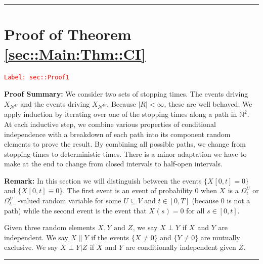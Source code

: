 \documentclass[12pt]{article}
\newcommand{\skipLine}{\vspace{12pt}}
\newcommand{\mb}{\mathbb}
\newcommand{\mc}{\mathcal}
\newcommand{\te}{\text}
\newcommand{\tr}{\textcolor{red}}
\newcommand{\labe}[1]{\tr{\texttt{Label: #1}}}
\newcommand{\pfsum}{\textbf{Proof Summary: }}
\newcommand{\ind}{\hspace{24pt}}
\newcommand{\lin}{\rule{\linewidth}{0.4 pt}}
\renewcommand{\U}{U}							%
\newcommand{\UU}{W}								%
\newcommand{\UUU}{R}							%
\newcommand{\T}{T}								%
\renewcommand{\t}{t}							%
\newcommand{\sset}{\Omega}						%
\renewcommand{\tt}{s}							%
\newcommand{\X}{X}								%
\newcommand{\neigh}{\mc{N}}						%
\newcommand{\vind}[1]{^{#1}}					%
\newcommand{\vsi}[1]{^{#1}}						%
\newcommand{\cind}[1]{_{#1}}					%
\newcommand{\tp}[1]{(#1)}						%
\newcommand{\tip}[1]{#1}						%
\newcommand{\ts}[1]{_{#1}}						%
\newcommand{\XX}{Y}								%
\newcommand{\XXX}{Z}							%
\newcommand{\mutex}{\|}							%
\begin{document}
\lin

\section{Proof of Theorem \ref{sec::Main:Thm::CI}}
\label{sec::Proof1}\labe{sec::Proof1}

\pfsum We consider two sets of stopping times. The events driving \(\X\cind{\neigh\vind{\U}}\) and the events driving \(\X\cind{\neigh\vind{\UU}}\). Because \(|\UUU| < \infty\), these are well behaved. We apply induction by iterating over one of the stopping times along a path in \(\mb{N}^2\). At each inductive step, we combine various properties of conditional independence with a breakdown of each path into its component random elements to prove the result. By combining all possible paths, we change from stopping times to deterministic times. There is a minor adaptation we have to make at the end to change from closed intervals to half-open intervals.

\skipLine

\textbf{Remark:} In this section we will distinguish between the events \(\{\X\cind{}\tip{[0,\t]} = 0\}\) and \(\{\X\cind{}\tip{[0,\t]}\equiv 0\}\). The first event is an event of probability 0 when \(\X\cind{}\tip{}\) is a \(\sset\vsi{\U}\ts{\t}\) or \(\sset\vsi{\U}\ts{\t-}\)-valued random variable for some \(\U\subseteq V\) and \(\t \in [0,\T]\) (because 0 is not a path) while the second event is the event that \(\X\cind{}\tp{\tt} = 0\) for all \(\tt \in [0,\t]\).

\ind Given three random elements \(\X\cind{}\tip{},\XX\cind{}\tip{} \te{ and } \XXX\cind{}\tip{}\), we say \(\X\cind{}\tip{}\perp \XX\cind{}\tip{}\) if \(\X\cind{}\tip{}\) and \(\XX\cind{}\tip{}\) are independent. We say \(\X\cind{}\tip{}\mutex \XX\cind{}\tip{}\) if the events \(\{\X\cind{}\tip{}\neq 0\}\) and \(\{\XX\cind{}\tip{} \neq 0\}\) are mutually exclusive. We say \(\X\cind{}\tip{}\perp \XX\cind{}\tip{}|\XXX\cind{}\tip{}\) if \(\X\cind{}\tip{}\) and \(\XX\cind{}\tip{}\) are conditionally independent given \(\XXX\cind{}\tip{}\).

\lin
\end{document}
